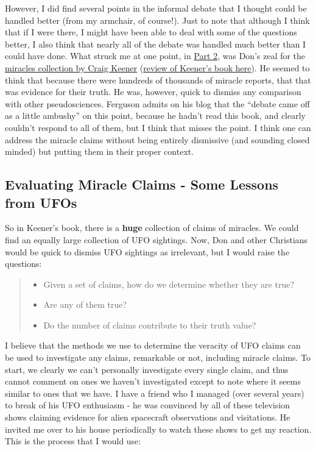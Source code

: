 However, I did find several points in the informal debate that I thought
could be handled better (from my armchair, of course!). Just to note
that although I think that if I were there, I might have been able to
deal with some of the questions better, I also think that nearly all of
the debate was handled much better than I could have done. What struck
me at one point, in
\href{http://donjohnsonministries.org/discussion-with-naturalist-matthew-ferguson-part-2/)}{Part
2}, was Don's zeal for the
\href{http://www.amazon.com/Miracles-Credibility-New-Testament-Accounts/dp/0801039525}{miracles
collection by Craig Keener}
(\href{http://www.uncrediblehallq.net/2012/01/0shou5/review-of-craig-keeners-miracles/)}{review
of Keener's book here}). He seemed to think that because there were
hundreds of thousands of miracle reports, that that was evidence for
their truth. He was, however, quick to dismiss any comparison with other
pseudosciences. Ferguson admits on his blog that the ``debate came off
as a little ambushy'' on this point, because he hadn't read this book,
and clearly couldn't respond to all of them, but I think that misses the
point. I think one can address the miracle claims without being entirely
dismissive (and sounding closed minded) but putting them in their proper
context.

\subsection{Evaluating Miracle Claims - Some Lessons from
UFOs}\label{pandoc-evaluating-miracle-claims---some-lessons-from-ufos}

So in Keener's book, there is a \textbf{huge} collection of claims of
miracles. We could find an equally large collection of UFO sightings.
Now, Don and other Christians would be quick to dismiss UFO sightings as
irrelevant, but I would raise the questions:

\begin{quote}
\begin{itemize}
\itemsep1pt\parskip0pt
\item
  Given a set of claims, how do we determine whether they are true?
\item
  Are any of them true?
\item
  Do the number of claims contribute to their truth value?
\end{itemize}
\end{quote}

I believe that the methods we use to determine the veracity of UFO
claims can be used to investigate any claims, remarkable or not,
including miracle claims. To start, we clearly we can't personally
investigate every single claim, and thus cannot comment on ones we
haven't investigated except to note where it seems similar to ones that
we have. I have a friend who I managed (over several years) to break of
his UFO enthusiasm - he was convinced by all of these television shows
claiming evidence for alien spacecraft observations and visitations. He
invited me over to his house periodically to watch these shows to get my
reaction. This is the process that I would use:


